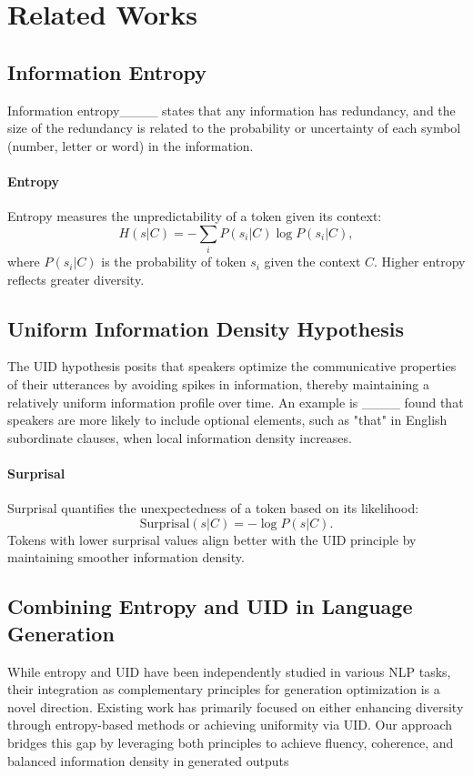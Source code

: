 \section{Related Works}
\subsection{Information Entropy}

Information entropy____ states that any information has redundancy, and the size of the redundancy is related to the probability or uncertainty of each symbol (number, letter or word) in the information. 

\paragraph{Entropy}
Entropy measures the unpredictability of a token given its context:
\[
H(s|C) = - \sum_{i} P(s_i|C) \log P(s_i|C),
\]
where \( P(s_i|C) \) is the probability of token \( s_i \) given the context \( C \). Higher entropy reflects greater diversity.

\subsection{Uniform Information Density Hypothesis}

The UID hypothesis posits that speakers optimize the communicative properties of their utterances by avoiding spikes in information, thereby maintaining a relatively uniform information profile over time. An example is ____ found that speakers are more likely to include optional elements, such as "that" in English subordinate clauses, when local information density increases. 

\paragraph{Surprisal}
Surprisal quantifies the unexpectedness of a token based on its likelihood:
\[
\text{Surprisal}(s|C) = -\log P(s|C).
\]
Tokens with lower surprisal values align better with the UID principle by maintaining smoother information density.

\subsection{Combining Entropy and UID in Language Generation}

While entropy and UID have been independently studied in various NLP tasks, their integration as complementary principles for generation optimization is a novel direction. Existing work has primarily focused on either enhancing diversity through entropy-based methods or achieving uniformity via UID. Our approach bridges this gap by leveraging both principles to achieve fluency, coherence, and balanced information density in generated outputs